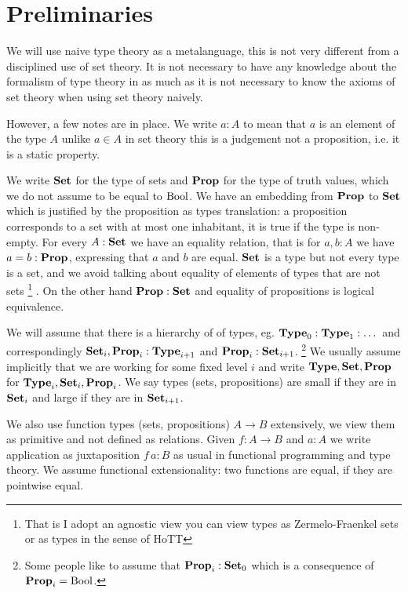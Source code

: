 \section{Preliminaries}
\label{sec:prelim}

We will use naive type theory as a metalanguage, this is not very different from a disciplined use of set theory. It is not necessary to have any knowledge about the formalism of type theory in as much as it is not necessary to know the axioms of set theory when using set theory naively.

However, a few notes are in place. We write $a : A$ to mean that $a$ is an element of the type $A$ unlike $a \in A$ in set theory this is a judgement not a proposition, i.e. it is a static property.

We write $\mathbf{Set}$ for the type of sets and $\mathbf{Prop}$ for the type of truth values, which we do not assume to be equal to  $\mathrm{Bool}$. We have an embedding from $\mathbf{Prop}$ to $\mathbf{Set}$ which is justified by the proposition as types translation: a proposition corresponds to a set with at most one inhabitant, it  is true if the type is non-empty. For every $A:\mathbf{Set}$ we have an equality relation, that is for $a,b : A$ we have $a = b : \mathbf{Prop}$, expressing that $a$ and $b$ are equal. $\mathbf{Set}$ is a type but not every type is a set, and we avoid talking about equality of elements of types that are not sets%
\footnote{That is I adopt an agnostic view you can view types as Zermelo-Fraenkel sets or as types in the sense of HoTT}%
. On the other hand $\mathbf{Prop} : \mathbf{Set}$ and equality of propositions is logical equivalence. 

We will assume that there is a hierarchy of of types, eg. $\mathbf{Type}_0 : \mathbf{Type}_1 : \dots$ and correspondingly $\mathbf{Set}_i,\mathbf{Prop}_i : \mathbf{Type}_{i+1}$ and $\mathbf{Prop}_i : \mathbf{Set}_{i+1}$.
\footnote{Some people like to assume that $\mathbf{Prop}_i : \mathbf{Set}_0$ which is a consequence of $\mathbf{Prop}_i = \mathrm{Bool}$.}
We usually assume implicitly that we are working for some fixed level $i$ and write $\mathbf{Type},\mathbf{Set},\mathbf{Prop}$ for $\mathbf{Type}_i,\mathbf{Set}_i,\mathbf{Prop}_i$. We say types (sets, propositions) are small if they are in $\mathbf{Set}_i$ and large if they are in $\mathbf{Set}_{i+1}$.


We also use function types (sets, propositions) $A \to B$  extensively, we view them as primitive and not defined as relations. Given $f : A \to B$ and $a : A$ we write application as juxtaposition $f\,a : B$ as usual in functional programming and type theory. We assume functional extensionality: two functions are equal, if they are pointwise equal. 

